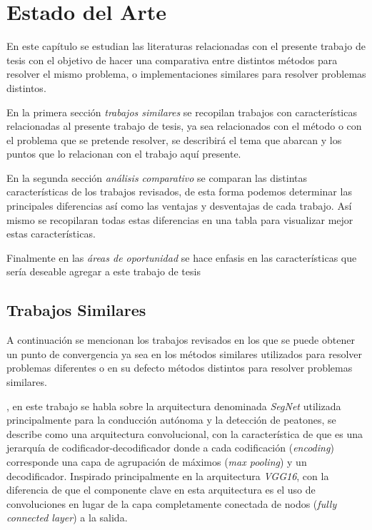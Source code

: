 \chapter{Estado del Arte}
En este capítulo se estudian las literaturas relacionadas con el presente trabajo de tesis con el objetivo de hacer una comparativa entre distintos métodos para resolver el mismo problema, o implementaciones similares para resolver problemas distintos.

En la primera sección \emph{trabajos similares} se recopilan trabajos con características relacionadas al presente trabajo de tesis, ya sea relacionados con el método o con el problema que se pretende resolver, se describirá el tema que abarcan y los puntos que lo relacionan con el trabajo aquí presente. 

En la segunda sección \emph{análisis comparativo} se comparan las distintas características de los trabajos revisados, de esta forma podemos determinar las principales diferencias así como las ventajas y desventajas de cada trabajo. Así mismo se recopilaran todas estas diferencias en una tabla para visualizar mejor estas características.

Finalmente en las \emph{áreas de oportunidad} se hace enfasis en las características que sería deseable agregar a este trabajo de tesis

\section{Trabajos Similares}

A continuación se mencionan los trabajos revisados en los que se puede obtener un punto de convergencia ya sea en los métodos similares utilizados para resolver problemas diferentes o en su defecto métodos distintos para resolver problemas similares.

\citet{DBLP:journals/corr/BadrinarayananK15}, en este trabajo se habla sobre la arquitectura denominada \emph{SegNet} utilizada principalmente para la conducción autónoma y la detección de peatones, se describe como una arquitectura convolucional, con la característica de que es una jerarquía de codificador-decodificador donde a cada codificación (\emph{encoding}) corresponde una capa de agrupación de máximos (\emph{max pooling}) y un decodificador. Inspirado principalmente en la arquitectura \emph{VGG16}, con la diferencia de que el componente clave en esta arquitectura es el uso de convoluciones en lugar de la capa completamente conectada de nodos (\emph{fully connected layer}) a la salida.


